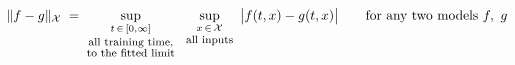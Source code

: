 \documentclass[12pt,border=2pt]{standalone}
\begin{document}
\begin{minipage}{6.9in}
\[
 \|f-g\|_{\mathcal X}
 \;=\;
 \sup_{\substack{t\,\in\,[0,\infty]\\[2pt] \text{\footnotesize all training time,}\\ \text{\footnotesize to the fitted limit}}}
 \ \ 
 \sup_{\substack{x\,\in\,\mathcal X\\[2pt] \text{\footnotesize all inputs}}}
 \ \big|f(t,x)-g(t,x)\big|
 \qquad\text{for any two models } f,\ g
\]
\end{minipage}
\end{document}
